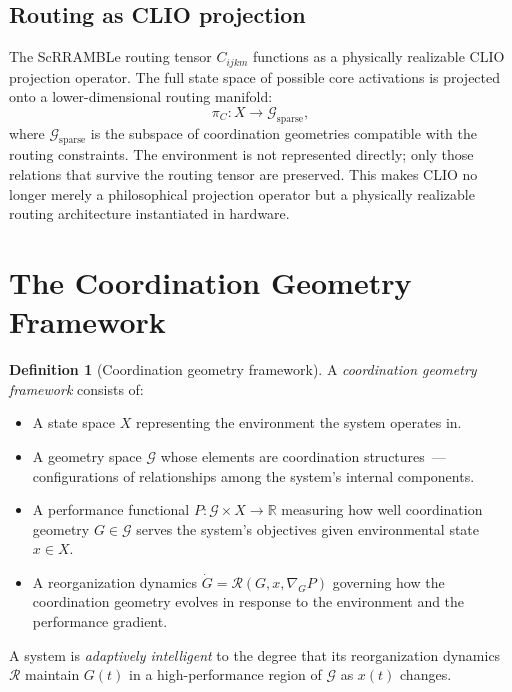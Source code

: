 \documentclass[11pt, a4paper]{article}
\theoremstyle{definition}
\newtheorem{definition}{Definition}
\theoremstyle{remark}
\begin{document}
\subsection*{Routing as CLIO projection}

The ScRRAMBLe routing tensor $C_{ijkm}$ functions as a physically
realizable CLIO projection operator. The full state space of possible
core activations is projected onto a lower-dimensional routing manifold:
\[
\pi_C: X \to \mathcal{G}_{\mathrm{sparse}},
\]
where $\mathcal{G}_{\mathrm{sparse}}$ is the subspace of coordination
geometries compatible with the routing constraints. The environment is not
represented directly; only those relations that survive the routing tensor
are preserved. This makes CLIO no longer merely a philosophical projection
operator but a physically realizable routing architecture instantiated in
hardware.

\section{The Coordination Geometry Framework}

\begin{definition}[Coordination geometry framework]
\label{def:cgf}
A \textit{coordination geometry framework} consists of:
\begin{itemize}
\item A state space $X$ representing the environment the system operates in.
\item A geometry space $\mathcal{G}$ whose elements are coordination
structures~--- configurations of relationships among the system's internal
components.
\item A performance functional $P: \mathcal{G} \times X \to \mathbb{R}$
measuring how well coordination geometry $G \in \mathcal{G}$ serves the
system's objectives given environmental state $x \in X$.
\item A reorganization dynamics $\dot{G} = \mathcal{R}(G, x, \nabla_G P)$
governing how the coordination geometry evolves in response to the
environment and the performance gradient.
\end{itemize}
A system is \textit{adaptively intelligent} to the degree that its
reorganization dynamics $\mathcal{R}$ maintain $G(t)$ in a high-performance
region of $\mathcal{G}$ as $x(t)$ changes.
\end{definition}
\end{document}
